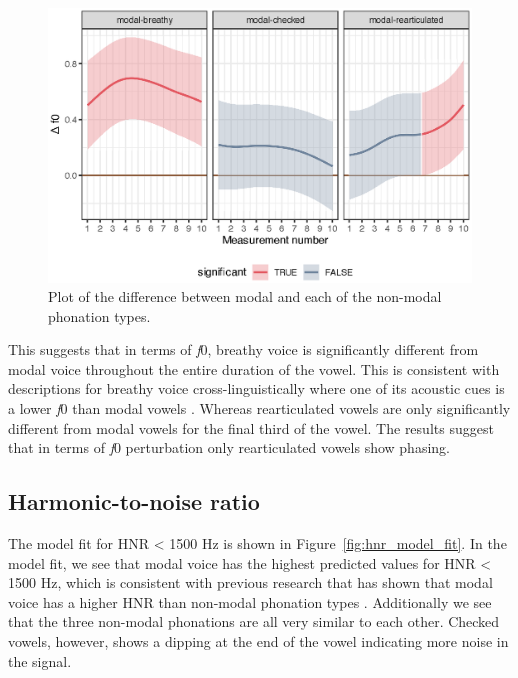 \begin{figure}[h!]
    \centering
    \includegraphics[width = \linewidth]{images/LCH_GAMMs/f0_model_diff.eps}
    \caption{Plot of the difference between modal and each of the non-modal phonation types.}
    \label{fig:f0_model_diff}
\end{figure}

This suggests that in terms of \textit{f}0, breathy voice is significantly different from modal voice throughout the entire duration of the vowel. This is consistent with descriptions for breathy voice cross-linguistically where one of its acoustic cues is a lower \textit{f}0 than modal vowels \citep[e.g.,][]{hillenbrandAcousticCorrelatesBreathy1996}. Whereas rearticulated vowels are only significantly different from modal vowels for the final third of the vowel. The results suggest that in terms of \textit{f}0 perturbation only rearticulated vowels show phasing. 
\subsection{Harmonic-to-noise ratio} \label{sec:model_hnr}

The model fit for HNR < 1500 Hz is shown in Figure~\ref{fig:hnr_model_fit}. In the model fit, we see that modal voice has the highest predicted values for HNR < 1500 Hz, which is consistent with previous research that has shown that modal voice has a higher HNR than non-modal phonation types \citep[e.g.,][]{blankenshipTimeCourseBreathiness1997,blankenshipTimingNonmodalPhonation2002,dekromCepstrumBasedTechniqueDetermining1993,garellekTimingSequencingCoarticulated2012,garellekPhoneticsVoice2019,gerrattTaxonomyNonmodalPhonation2001}. Additionally we see that the three non-modal phonations are all very similar to each other. Checked vowels, however, shows a dipping at the end of the vowel indicating more noise in the signal. 

